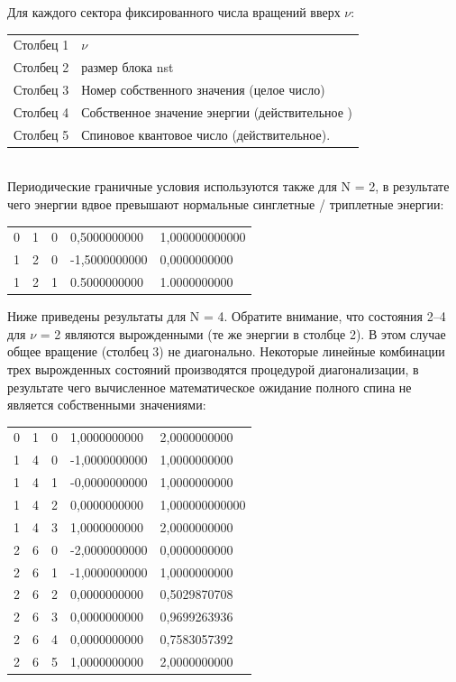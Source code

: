 \documentclass[11pt]{article}
\begin{document}
Для каждого сектора фиксированного числа вращений вверх $\nu$:\\
\begin{tabular}{ll}
Столбец 1 & $\nu$  \\
Столбец 2 & размер блока nst \\
Столбец 3 & Номер собственного значения (целое число) \\
Столбец 4 & Собственное значение энергии (действительное ) \\
Столбец 5 & Спиновое квантовое число (действительное). \\
\end{tabular}\\

Периодические граничные условия используются также для N = 2, в результате чего энергии вдвое превышают нормальные синглетные / триплетные энергии: \\

\begin{tabular}{lllll}
 0 & 1 & 0 & 0,5000000000 & 1,000000000000 \\
 1 & 2 & 0 & -1,5000000000 & 0,0000000000 \\
 1 & 2 & 1 & 0.5000000000 & 1.0000000000 \\
\end{tabular}

Ниже приведены результаты для N = 4. Обратите внимание, что состояния 2–4 для $\nu$ = 2 являются вырожденными (те же энергии в столбце 2). В этом случае общее вращение (столбец 3) не диагонально. Некоторые линейные комбинации трех вырожденных состояний производятся процедурой диагонализации, в результате чего вычисленное математическое ожидание полного спина не является собственными значениями:\\

\begin{tabular}{lllll}
    0 & 1 & 0 & 1,0000000000 & 2,0000000000 \\
    1 & 4 & 0 & -1,0000000000 & 1,0000000000 \\
    1 & 4 & 1 & -0,0000000000 & 1,0000000000 \\
    1 & 4 & 2 & 0,0000000000 & 1,000000000000 \\
    1 & 4 & 3 & 1,0000000000 & 2,0000000000 \\
    2 & 6 & 0 & -2,0000000000 & 0,0000000000 \\
    2 & 6 & 1 & -1,0000000000 & 1,0000000000 \\
    2 & 6 & 2 & 0,0000000000 & 0,5029870708 \\
    2 & 6 & 3 & 0,0000000000 & 0,9699263936 \\
    2 & 6 & 4 & 0,0000000000 & 0,7583057392 \\
    2 & 6 & 5 & 1,0000000000 & 2,0000000000 \\
\end{tabular} \\
\end{document}
